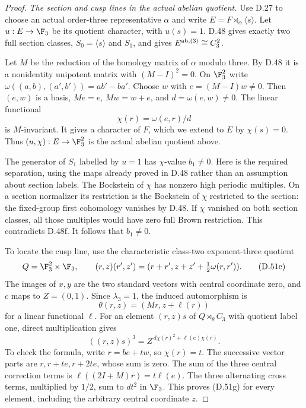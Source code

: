 \begin{proof}
\emph{The section and cusp lines in the actual abelian quotient.}
Use D.27 to choose an actual order-three representative
$\alpha$ and write $E=F\rtimes_\alpha\langle s\rangle$.
Let $u:E\to\F_3$ be its quotient character, with $u(s)=1$.
D.48 gives exactly two full section classes,
$S_0=\langle s\rangle$ and $S_1$, and gives
$E^{\rm ab,(3)}\cong C_3^2$.

Let $M$ be the reduction of the homology matrix of
$\alpha$ modulo three. By D.48 it is a nonidentity
unipotent matrix with $(M-I)^2=0$.
On $\F_3^2$ write
$\omega((a,b),(a',b'))=ab'-ba'$.
Choose $w$ with $e=(M-I)w\ne0$.
Then $(e,w)$ is a basis, $Me=e$, $Mw=w+e$,
and $d=\omega(e,w)\ne0$.
The linear functional
\[
                  \chi(r)=\omega(e,r)/d
                                                        \tag{D.51d}
\]
is $M$-invariant. It gives a character of $F$,
which we extend to $E$ by $\chi(s)=0$.
Thus $(u,\chi):E\to\F_3^2$ is the actual
abelian quotient above.

The generator of $S_1$ labelled by $u=1$
has $\chi$-value $b_1\ne0$.
Here is the required separation, using the maps
already proved in D.48 rather than an assumption
about section labels.
The Bockstein of $\chi$ has nonzero high periodic
multiples. On a section normalizer its restriction
is the Bockstein of $\chi$ restricted to the section:
the fixed-group first cohomology vanishes by D.48.
If $\chi$ vanished on both section classes,
all those multiples would have zero full Brown
restriction. This contradicts D.48f.
It follows that $b_1\ne0$.

To locate the cusp line, use the characteristic
class-two exponent-three quotient
\[
 Q=\F_3^2\times\F_3,\qquad
 (r,z)(r',z')=(r+r',z+z'+\tfrac12\omega(r,r')) .
                                                        \tag{D.51e}
\]
The images of $x,y$ are the two standard vectors
with central coordinate zero, and $c$ maps to
$Z=(0,1)$.
Since $\lambda_3=1$, the induced automorphism is
\[
               \theta(r,z)=(Mr,z+\ell(r))
                                                        \tag{D.51f}
\]
for a linear functional $\ell$.
For an element $(r,z)s$ of $Q\rtimes_\theta C_3$
with quotient label one, direct multiplication gives
\[
       ((r,z)s)^3
          =Z^{\,d\chi(r)^2+\ell(e)\chi(r)} .
                                                        \tag{D.51g}
\]
To check the formula, write $r=be+tw$, so
$\chi(r)=t$. The successive vector parts are
$r,r+te,r+2te$, whose sum is zero.
The sum of the three central correction terms
is $\ell((2I+M)r)=t\ell(e)$.
The three alternating cross terms, multiplied
by $1/2$, sum to $dt^2$ in $\F_3$.
This proves (D.51g) for every element, including
the arbitrary central coordinate $z$.


\end{proof}
